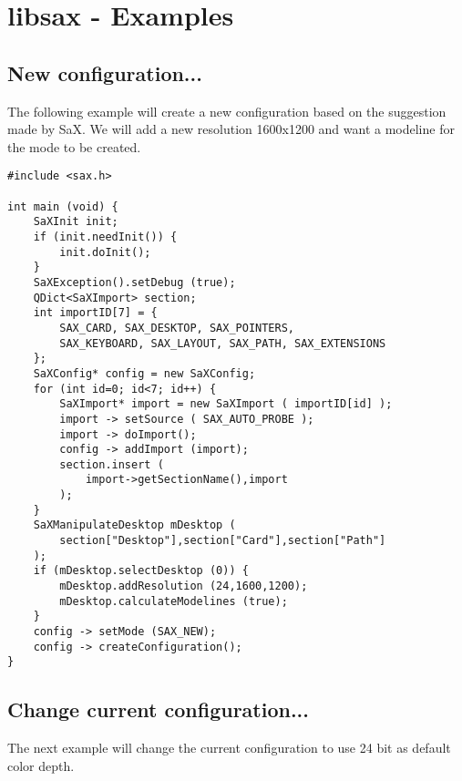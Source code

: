 \chapter{libsax - Examples}

\section{New configuration...}
The following example will create a new configuration based on the
suggestion made by SaX. We will add a new resolution 1600x1200 and
want a modeline for the mode to be created.

\begin{Command}{12cm}
\begin{small}
\begin{verbatim}
#include <sax.h>

int main (void) {
    SaXInit init;
    if (init.needInit()) {
        init.doInit();
    }
    SaXException().setDebug (true);
    QDict<SaXImport> section;
    int importID[7] = {
        SAX_CARD, SAX_DESKTOP, SAX_POINTERS,
        SAX_KEYBOARD, SAX_LAYOUT, SAX_PATH, SAX_EXTENSIONS
    };
    SaXConfig* config = new SaXConfig;
    for (int id=0; id<7; id++) {
        SaXImport* import = new SaXImport ( importID[id] );
        import -> setSource ( SAX_AUTO_PROBE );
        import -> doImport();
        config -> addImport (import);
        section.insert (
            import->getSectionName(),import
        );
    }
    SaXManipulateDesktop mDesktop (
        section["Desktop"],section["Card"],section["Path"]
    );
    if (mDesktop.selectDesktop (0)) {
        mDesktop.addResolution (24,1600,1200);
        mDesktop.calculateModelines (true);
    }
    config -> setMode (SAX_NEW);
    config -> createConfiguration();
}
\end{verbatim}
\end{small}
\end{Command}

\newpage

\section{Change current configuration...}
The next example will change the current configuration to use
24 bit as default color depth.

